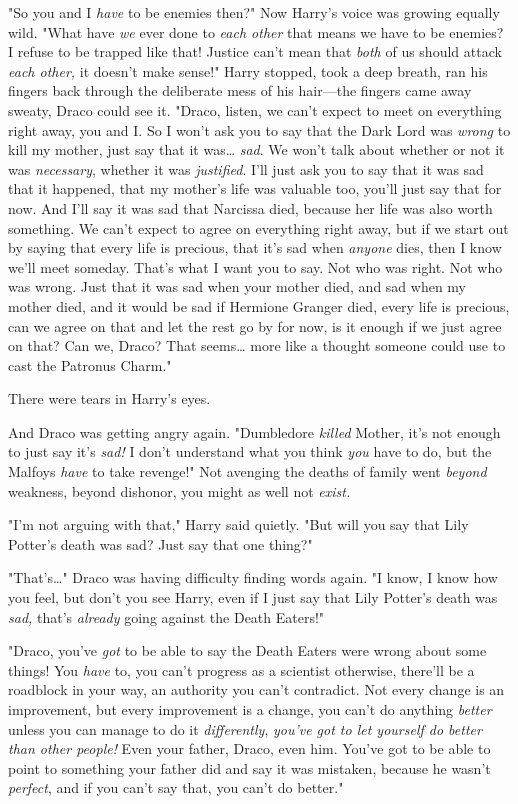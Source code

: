 "So you and I \emph{have} to be enemies then?" Now Harry's voice was growing 
equally wild. "What have \emph{we} ever done to \emph{each other} that means we 
have to be enemies? I refuse to be trapped like that! Justice can't mean that 
\emph{both} of us should attack \emph{each other,} it doesn't make sense!" 
Harry stopped, took a deep breath, ran his fingers back through the deliberate 
mess of his hair---the fingers came away sweaty, Draco could see it. "Draco, 
listen, we can't expect to meet on everything right away, you and I. So I won't 
ask you to say that the Dark Lord was \emph{wrong} to kill my mother, just say 
that it was{\ldots} \emph{sad}. We won't talk about whether or not it was 
\emph{necessary}, whether it was \emph{justified}. I'll just ask you to say 
that it was sad that it happened, that my mother's life was valuable too, 
you'll just say that for now. And I'll say it was sad that Narcissa died, 
because her life was also worth something. We can't expect to agree on 
everything right away, but if we start out by saying that every life is 
precious, that it's sad when \emph{anyone} dies, then I know we'll meet 
someday. That's what I want you to say. Not who was right. Not who was wrong. 
Just that it was sad when your mother died, and sad when my mother died, and it 
would be sad if Hermione Granger died, every life is precious, can we agree on 
that and let the rest go by for now, is it enough if we just agree on that? Can 
we, Draco? That seems{\ldots} more like a thought someone could use to cast the 
Patronus Charm."

There were tears in Harry's eyes.

And Draco was getting angry again. "Dumbledore \emph{killed} Mother, it's not 
enough to just say it's \emph{sad!} I don't understand what you think 
\emph{you} have to do, but the Malfoys \emph{have} to take revenge!" Not 
avenging the deaths of family went \emph{beyond} weakness, beyond dishonor, you 
might as well not \emph{exist.}

"I'm not arguing with that," Harry said quietly. "But will you say that Lily 
Potter's death was sad? Just say that one thing?"

"That's{\ldots}" Draco was having difficulty finding words again. "I know, I 
know how you feel, but don't you see Harry, even if I just say that Lily 
Potter's death was \emph{sad,} that's \emph{already} going against the Death 
Eaters!"

"Draco, you've \emph{got} to be able to say the Death Eaters were wrong about 
some things! You \emph{have} to, you can't progress as a scientist otherwise, 
there'll be a roadblock in your way, an authority you can't contradict. Not 
every change is an improvement, but every improvement is a change, you can't do 
anything \emph{better} unless you can manage to do it \emph{differently}, 
\emph{you've got to let yourself do better than other people!} Even your 
father, Draco, even him. You've got to be able to point to something your 
father did and say it was mistaken, because he wasn't \emph{perfect}, and if 
you can't say that, you can't do better."


